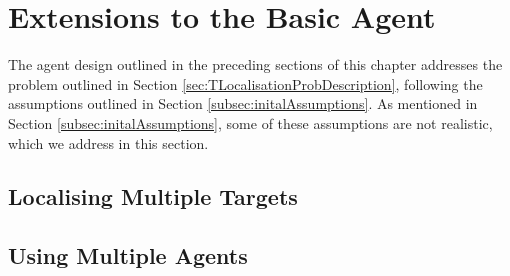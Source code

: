 \section{Extensions to the Basic Agent}
The agent design outlined in the preceding sections of this chapter addresses the problem outlined in Section \ref{sec:TLocalisationProbDescription},  following the assumptions outlined in Section \ref{subsec:initalAssumptions}. As mentioned in Section \ref{subsec:initalAssumptions}, some of these assumptions are not realistic, which we address in this section. \par

\subsection{Localising Multiple Targets}\label{subsubsec:LocalisingMultipleTargets}


\subsection{Using Multiple Agents}\label{subsubsec:UsingMultipleAgents}
